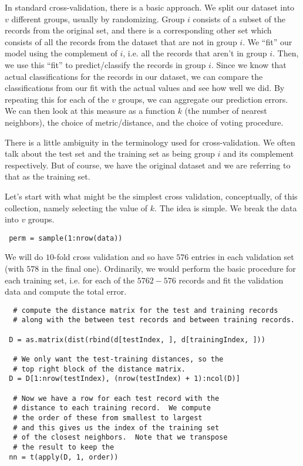 In standard cross-validation, there is a basic approach.  We split our
dataset into $v$ different groups, usually by randomizing.  Group $i$
consists of a subset of the records from the original set, and there
is a corresponding other set which consists of all the records from
the dataset that are not in group $i$.  We ``fit'' our model using the
complement of $i$, i.e. all the records that aren't in group $i$.
Then, we use this ``fit'' to predict/classify the records in group
$i$.  Since we know that actual classifications for the records in our
dataset, we can compare the classifications from our fit with the
actual values and see how well we did.  By repeating this for each of
the $v$ groups, we can aggregate our prediction errors. We can then
look at this measure as a function $k$ (the number of nearest
neighbors), the choice of metric/distance, and the choice of voting
procedure.


There is a little ambiguity in the terminology used for
cross-validation. We often talk about the test set and the training
set as being group $i$ and its complement respectively.  But of
course, we have the original dataset and we are referring to that as
the training set.


Let's start with what might be the simplest cross validation,
conceptually, of this collection, namely selecting the value of $k$.
The idea is simple.
We break the data into $v$ groups.
\begin{verbatim}
 perm = sample(1:nrow(data))
\end{verbatim}
We will do $10$-fold cross validation and so have $576$ entries in
each validation set (with $578$ in the final one).  Ordinarily, we
would perform the basic procedure for each training set, i.e. for each
of the $5762-576$ records and fit the validation data
and compute the total error.
\begin{verbatim}
  # compute the distance matrix for the test and training records
  # along with the between test records and between training records.
  
 D = as.matrix(dist(rbind(d[testIndex, ], d[trainingIndex, ]))

  # We only want the test-training distances, so the 
  # top right block of the distance matrix. 
 D = D[1:nrow(testIndex), (nrow(testIndex) + 1):ncol(D)] 

  # Now we have a row for each test record with the 
  # distance to each training record.  We compute
  # the order of these from smallest to largest
  # and this gives us the index of the training set
  # of the closest neighbors.  Note that we transpose 
  # the result to keep the  
 nn = t(apply(D, 1, order))
\end{verbatim}

